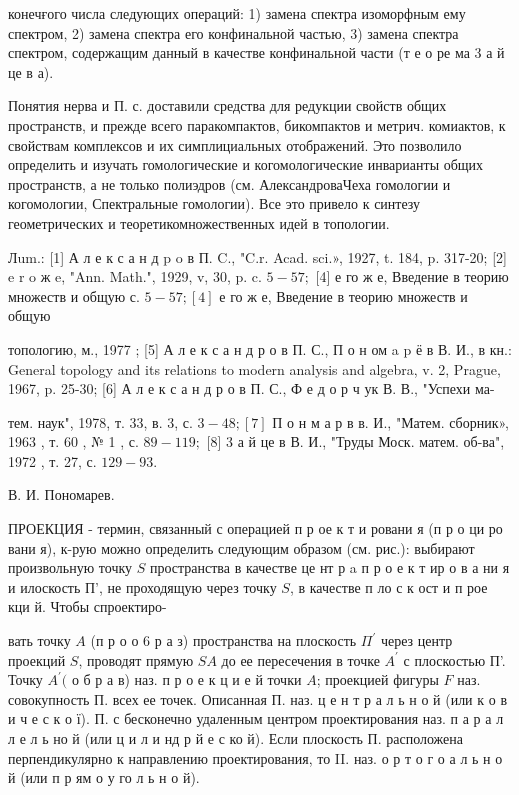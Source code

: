 \documentclass[10pt]{article}
\begin{document}
конечғого числа следующих операций: 1) замена спектра изоморфным ему спектром, 2) замена спектра его конфинальной частью, 3) замена спектра спектром, содержащим данный в качестве конфинальной части (т е о ре ма 3 а й це в а).



Понятия нерва и П. с. доставили средства для редукции свойств общих пространств, и прежде всего паракомпактов, бикомпактов и метрич. комиактов, к свойствам комплексов и их симплициальных отображений. Это позволило определить и изучать гомологические и когомологические инварианты общих пространств, а не только полиэдров (см. АлександроваЧеха гомологии и когомологии, Спектральные гомологии). Все это привело к синтезу геометрических и теоретикомножественных идей в топологии.



Лum.: [1] А л е к с а н д p o в П. C., "C.r. Acad. sci.», 1927, t. 184, p. 317-20; [2] e r o ж e, "Ann. Math.", 1929, v, 30, p. c. $5-57 ;$ [4] е го ж е, Введение в теорию множеств и общую с. $5-57 ;[4]$ е го ж е, Введение в теорию множеств и общую

топологию, м., 1977 ; [5] А л е к с а н д р о в П. С., П о н ом a p ё в В. И., в кн.: General topology and its relations to modern analysis and algebra, v. 2, Prague, 1967, p. 25-30; [6] А л е к с а н д р о в П. С., Ф е д о р ч ук В. В., "Успехи ма-

тем. наук", 1978, т. 33, в. 3, с. $3-48 ;[7]$ П о н м а р в в. И., "Матем. сборник», 1963 , т. 60 , № 1 , с. $89-119 ;$ [8] 3 а й це в В. И., "Труды Моск. матем. об-ва", 1972 , т. 27, с. $129-93$.

В. И. Пономарев.



ПРОЕКЦИЯ - термин, связанный с операцией п р ое к т и ровани я (п р о ци ро вани я), к-рую можно определить следующим образом (см. рис.): выбирают произвольную точку $S$ пространства в качестве це нт р a п р о е к т ир о в а ни я и илоскость П', не проходящую через точку $S$, в качестве п ло с к ост и п рое кци й. Чтобы спроектиро-



вать точку $A$ (п р о о 6 р а з) пространства на плоскость $\Pi^{\prime}$ через центр проекций $S$, проводят прямую $S A$ до ее пересечения в точке $A^{\prime}$ с плоскостью П'. Точку $A^{\prime}($ о б р а в) наз. п р о е к ц и е й точки $A$; проекцией фигуры $F$ наз. совокупность П. всех ее точек. Описанная П. наз. ц е н т р а л ь н о й (или к о в и ч е с к о ї). П. с бесконечно удаленным центром проектирования наз. п а р а л л е л ь но й (или ц и л и нд р й е с ко й). Если плоскость П. расположена перпендикулярно к направлению проектирования, то II. наз. о р т о г о а л ь н о й (или п р ям о у го л ь н о й).
\end{document}
